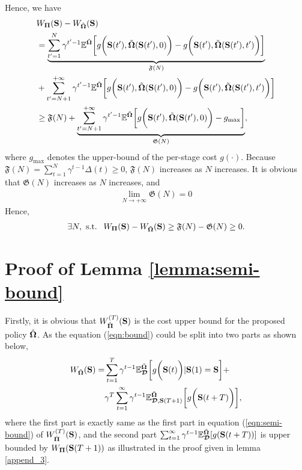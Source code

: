 Hence, we have
{\small
\begin{align*}
&W_{\boldsymbol{\Pi}}(\mathbf{S})- W_{\tilde{\boldsymbol{\Omega}}}(\mathbf{S})\\
&= 
\underbrace{\sum_{t'=1}^{N} \gamma^{t'-1} \mathbb{E}^{ \tilde{\boldsymbol{\Omega}} } \bigg[
	g\bigg(\mathbf{S}(t'), \tilde{\boldsymbol{\Omega}}(\mathbf{S}(t'),0)\bigg)
	- 	g\bigg(\mathbf{S}(t'), \tilde{\boldsymbol{\Omega}}(\mathbf{S}(t'),t')\bigg)
\bigg]}_{\mathfrak{F}(N)}\\
&+\sum_{t'=N+1}^{+\infty} \gamma^{t'-1} \mathbb{E}^{ \tilde{\boldsymbol{\Omega}} } \bigg[
	g\bigg(\mathbf{S}(t'), \tilde{\boldsymbol{\Omega}}(\mathbf{S}(t'),0)\bigg)
	- 	g\bigg(\mathbf{S}(t'), \tilde{\boldsymbol{\Omega}}(\mathbf{S}(t'),t')\bigg)
\bigg]\\
&\geq \mathfrak{F}(N) + \underbrace{\sum_{t'=N+1}^{+\infty} \gamma^{t'-1} \mathbb{E}^{ \tilde{\boldsymbol{\Omega}} } \bigg[
	g\bigg(\mathbf{S}(t'), \tilde{\boldsymbol{\Omega}}(\mathbf{S}(t'),0)\bigg)
	- 	g_{\max}
\bigg]}_{\mathfrak{G}(N)},
\end{align*}
}%
where $g_{\max}$ denotes the upper-bound of the per-stage cost $g(\cdot)$.
Because  $\mathfrak{F}(N)=\sum_{t=1}^{N}\gamma^{t-1}\Delta(t)\geq 0$, $\mathfrak{F}(N)$ increases as $N$ increases.
It is obvious that $\mathfrak{G}(N)$ increases as $N$ increases, and 
\begin{align*}
\lim\limits_{N\to+\infty}\mathfrak{G}(N)=0
\end{align*}
Hence, 
\begin{align*}
\exists N,\ \mbox{s.t. }\ W_{\boldsymbol{\Pi}}(\mathbf{S})- W_{\tilde{\boldsymbol{\Omega}}}(\mathbf{S})\geq \mathfrak{F}(N)-\mathfrak{G}(N) \geq 0.
\end{align*}

\section{ Proof of Lemma \ref{lemma:semi-bound} }
\label{append_4}
Firstly, it is obvious that $W^{(T)}_{\hat{\boldsymbol{\Pi}}}(\mathbf{S})$ is the cost upper bound for the proposed policy $\tilde{\boldsymbol{\Omega}}$.
As the equation (\ref{eqn:bound}) could be split into two parts as shown below,
{\small
\begin{align*}
    W_{\tilde{\boldsymbol{\Omega}}}(\mathbf{S}) =&
    \sum_{t=1}^{T} \gamma^{t-1} \mathbb{E}^{\tilde{\boldsymbol{\Omega}}}_{\boldsymbol{\mathcal{D}}} \bigg[ g\bigg(\mathbf{S}(t)\bigg) | \mathbf{S}(1)=\mathbf{S} \bigg]
    +
    \nonumber\\
    &\gamma^{T} \sum_{t=1}^{\infty} \gamma^{t-1} \mathbb{E}^{\tilde{\boldsymbol{\Omega}}}_{\boldsymbol{\mathcal{D}},\mathbf{S}(T+1)} \bigg[ g\bigg(\mathbf{S}(t+T)\bigg) \bigg],
\end{align*}
}%
where the first part is exactly same as the first part in equation (\ref{eqn:semi-bound}) of $W^{(T)}_{\hat{\boldsymbol{\Pi}}}(\mathbf{S})$, and the second part $\sum_{t=1}^{\infty}\gamma^{t-1}\mathbb{E}^{\tilde{\boldsymbol{\Omega}}}_{\boldsymbol{\mathcal{D}}}[g(\mathbf{S}(t+T))]$ is upper bounded by $W_{\boldsymbol{\Pi}}(\mathbf{S}(T+1))$ as illustrated in the proof given in lemma \ref{append_3}.

